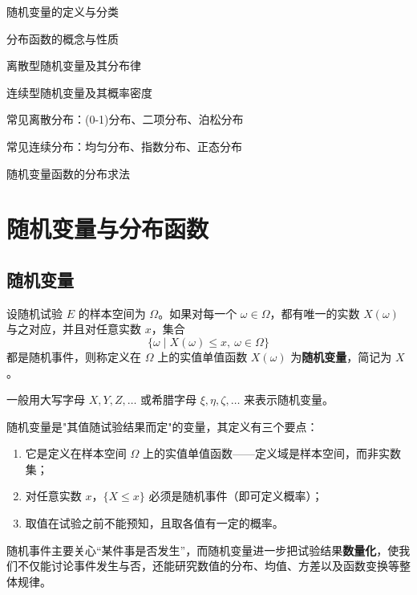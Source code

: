 ﻿\documentclass[lang=cn,11pt]{elegantbook}
\begin{document}
\begin{introduction}
  \item 随机变量的定义与分类
  \item 分布函数的概念与性质
  \item 离散型随机变量及其分布律
  \item 连续型随机变量及其概率密度
  \item 常见离散分布：(0-1)分布、二项分布、泊松分布
  \item 常见连续分布：均匀分布、指数分布、正态分布
  \item 随机变量函数的分布求法
\end{introduction}

\section{随机变量与分布函数}

\subsection{随机变量}

\begin{definition}[随机变量] \label{def:random-variable}
设随机试验 \(E\) 的样本空间为 \(\Omega\)。如果对每一个 \(\omega \in \Omega\)，都有唯一的实数 \(X(\omega)\) 与之对应，并且对任意实数 \(x\)，集合
\[
\{\omega \mid X(\omega) \le x,\ \omega \in \Omega\}
\]
都是随机事件，则称定义在 \(\Omega\) 上的实值单值函数 \(X(\omega)\) 为\textbf{随机变量}，简记为 \(X\)。
\end{definition}

一般用大写字母 \(X, Y, Z, \dots\) 或希腊字母 \(\xi, \eta, \zeta, \dots\) 来表示随机变量。

\begin{note}
随机变量是"其值随试验结果而定"的变量，其定义有三个要点：
\begin{enumerate}
    \item 它是定义在样本空间 \(\Omega\) 上的实值单值函数——定义域是样本空间，而非实数集；
    \item 对任意实数 \(x\)，\(\{X \le x\}\) 必须是随机事件（即可定义概率）；
    \item 取值在试验之前不能预知，且取各值有一定的概率。
\end{enumerate}
随机事件主要关心“某件事是否发生”，而随机变量进一步把试验结果\textbf{数量化}，使我们不仅能讨论事件发生与否，还能研究数值的分布、均值、方差以及函数变换等整体规律。
\end{note}
\end{document}
